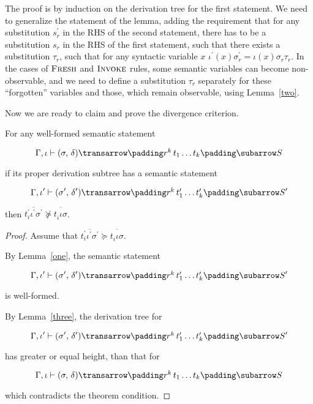 The proof is by induction on the derivation tree for the first statement. We need to generalize the statement of the lemma, adding the requirement that 
for any substitution $s^\prime_r$ in the RHS of the second statement, there has to be a substitution $s_r$ in the RHS of the first statement,
such that there exists a substitution $\tau_r$, such that for any syntactic variable $x$ \mbox{$\iota^\prime(x) \sigma^\prime_r = \iota(x) \sigma_r \tau_r$}. 
In the cases of $\textsc{Fresh}$ and $\textsc{Invoke}$ rules, some semantic variables can become non-observable, and we need to define a substitution $\tau_r$ 
separately for these ``forgotten'' variables and those, which remain observable, using Lemma~\ref{two}.

Now we are ready to claim and prove the divergence criterion.

\setcounter{theorem}{0}
\begin{theorem}
\label{criterion}
\normalfont
For any well-formed semantic statement 

$$
\otrans{\Gamma,\iota}{(\sigma,\,\delta)}{r^k\,t_1\dots t_k}{S}
$$ 

if its proper derivation subtree has a semantic statement 

$$
\otrans{\Gamma,\iota^\prime}{(\sigma^\prime,\,\delta^\prime)}{r^k\,t^\prime_1\dots t^\prime_k}{S^\prime}
$$

then \mbox{$\overline{t^\prime_i \iota^\prime \sigma^\prime} \not \succeq \overline{t^{\phantom{\prime}}_i \iota \sigma}$}. 
\end{theorem}
\begin{proof}
Assume that \mbox{$\overline{t^\prime_i \iota^\prime \sigma^\prime}\succeq \overline{t^{\phantom{\prime}}_i \iota \sigma}$}. 

By Lemma~\ref{one}, the semantic statement

$$
\otrans{\Gamma,\iota^\prime}{(\sigma^\prime,\,\delta^\prime)}{r^k\,t^\prime_1\dots t^\prime_k}{S^\prime}
$$

\noindent is well-formed.

By Lemma~\ref{three}, the derivation tree for

$$
\otrans{\Gamma,\iota^\prime}{(\sigma^\prime,\,\delta^\prime)}{r^k\,t^\prime_1\dots t^\prime_k}{S^\prime}
$$

\noindent has greater or equal height, than that for

$$
\otrans{\Gamma,\iota}{(\sigma,\,\delta)}{r^k\,t_1\dots t_k}{S}
$$ 

\noindent which contradicts the theorem condition.

\end{proof}

